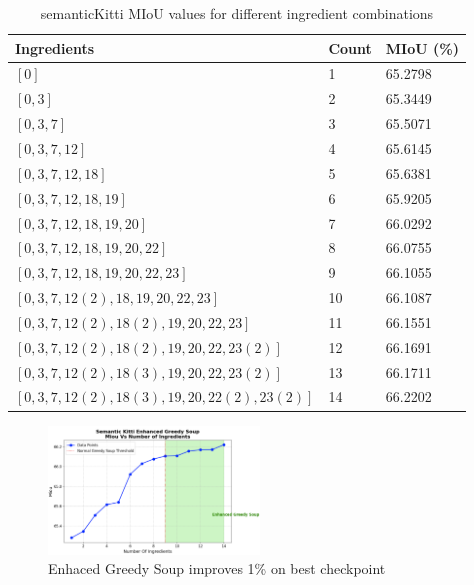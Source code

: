 \documentclass[10pt,twocolumn,letterpaper]{article}
\begin{document}
\begin{table}[htbp]
\centering
\small
\begin{tabular}{|l|l|l|}
\hline
\textbf{Ingredients} & \textbf{Count} & \textbf{MIoU (\%)} \\
\hline
$[0]$ & 1 & 65.2798 \\
$[0,3]$ & 2 & 65.3449 \\
$[0,3,7]$ & 3 & 65.5071 \\
$[0,3,7,12]$ & 4 & 65.6145 \\
$[0,3,7,12,18]$ & 5 & 65.6381 \\
$[0,3,7,12,18,19]$ & 6 & 65.9205 \\
$[0,3,7,12,18,19,20]$ & 7 & 66.0292 \\
$[0,3,7,12,18,19,20,22]$ & 8 & 66.0755 \\
$[0,3,7,12,18,19,20,22,23]$ & 9 & 66.1055 \\
$[0,3,7,12(2),18,19,20,22,23]$ & 10 & 66.1087 \\
$[0,3,7,12(2),18(2),19,20,22,23]$ & 11 & 66.1551 \\
$[0,3,7,12(2),18(2),19,20,22,23(2)]$ & 12 & 66.1691 \\
$[0,3,7,12(2),18(3),19,20,22,23(2)]$ & 13 & 66.1711 \\
$[0,3,7,12(2),18(3),19,20,22(2),23(2)]$ & 14 & 66.2202 \\
\hline
\end{tabular}
\caption{semanticKitti MIoU values for different ingredient combinations}
\end{table}

\begin{figure}[h]
    \centering
    \includegraphics[width=0.5\textwidth]{photos/semanticKitti.png}
    \caption{Enhaced Greedy Soup improves 1\% on best checkpoint }
    \label{fig:photo_example}
\end{figure}
\end{document}
